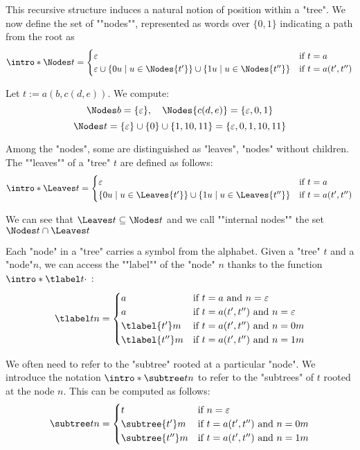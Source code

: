 \documentclass[a4paper,UKenglish,cleveref, autoref, thm-restate]{lipics-v2021}
\begin{document}
\AP This recursive structure induces a natural notion of position within a "tree". We now define the set of ""nodes"",
represented as words over $\{0,1\}$ indicating a path from the root as
\[
	\intro* \Nodes t =
	\begin{cases}
		\varepsilon                             & \text{if } t = a         \\
		\varepsilon \cup \setdef {0u} {u \in \Nodes {t'}}
		\cup \setdef {1u} {u \in \Nodes {t''} } & \text{if } t = a(t',t'')
	\end{cases}
\]

\begin{example}
	Let $ t := a(b, c(d, e)) $. We compute:
	\[
		\Nodes b  = \{\varepsilon\}, \quad \Nodes {c(d, e)} = \{\varepsilon, 0, 1\}
	\]
	\[
		\Nodes t = \{\varepsilon\} \cup \{0\} \cup \{1, 10, 11\} = \{\varepsilon, 0, 1, 10, 11\}
	\]
\end{example}

Among the "nodes", some are distinguished as "leaves", "nodes" without children.
\AP The ""leaves"" of a "tree" $t$ are defined as follows:
\[
	\intro* \Leaves t = \begin{cases}
		\varepsilon                              & \text{if } t = a         \\
		\setdef {0u} {u \in \Leaves {t'}}
		\cup \setdef {1u} {u \in \Leaves {t''} } & \text{if } t = a(t',t'')
	\end{cases}
\]

\AP We can see that $\Leaves t \subseteq \Nodes t$ and we call ""internal nodes"" the set $\Nodes t \cap \Leaves t$


Each "node" in a "tree" carries a symbol from the alphabet.
\AP Given a "tree" $t$ and a "node"$n$, we can access the ""label"" of the "node" $n$
thanks to the function $\intro* \tlabel t {\cdot}$ :
\[
	\tlabel t n =   \begin{cases}
		a               & \text{if } t = a \text{ and } n = \varepsilon         \\
		a               & \text{if } t = a(t',t'') \text{ and } n = \varepsilon \\
		\tlabel {t'} m  & \text{if } t = a(t',t'') \text{ and } n = 0m          \\
		\tlabel {t''} m & \text{if } t = a(t',t'') \text{ and } n = 1m
	\end{cases}
\]

We often need to refer to the "subtree" rooted at a particular "node".
\AP We introduce the notation $\intro* \subtree t n$ to refer to the "subtrees"
of $t$ rooted at the node $n$. This can be computed as follows:
\[
	\subtree t n =   \begin{cases}
		t                & \text{if }  n = \varepsilon                  \\
		\subtree {t'} m  & \text{if } t = a(t',t'') \text{ and } n = 0m \\
		\subtree {t''} m & \text{if } t = a(t',t'') \text{ and } n = 1m
	\end{cases}
\]
\end{document}
